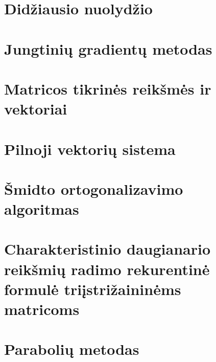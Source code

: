 \section{Didžiausio nuolydžio}
\cite[115-118]{textbook}
\section{Jungtinių gradientų metodas}
\cite[120-121]{textbook}

\section{Matricos tikrinės reikšmės ir vektoriai}
\section{Pilnoji vektorių sistema}
\cite[134]{textbook}
\section{Šmidto ortogonalizavimo algoritmas}
\cite[201]{textbook}
\section{Charakteristinio daugianario reikšmių radimo rekurentinė
formulė triįstrižaininėms matricoms}
\cite[135]{textbook}
\section{Parabolių metodas}
\cite[136-137]{textbook}
